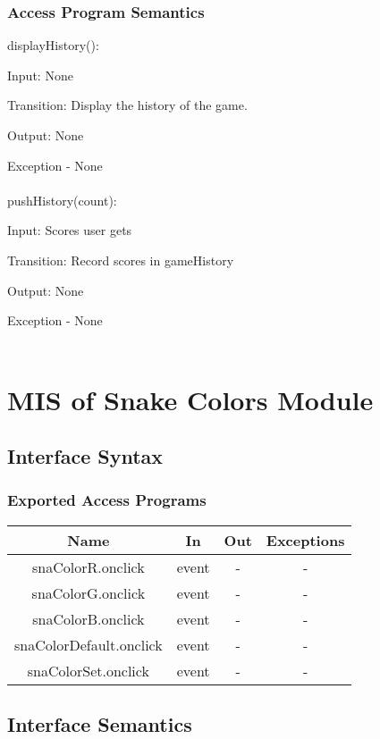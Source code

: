\documentclass[12pt, titlepage]{article}
\begin{document}
		\subsubsection{Access Program Semantics}

        displayHistory():

		Input: None
		
		Transition: Display the history of the game.
		
		Output: None
		
		Exception - None\\
		\\
		pushHistory(count):
		
			Input: Scores user gets
			
			Transition: Record scores in gameHistory
			
			Output: None
			 
			Exception - None\\
			\\


	
\section{MIS of Snake Colors Module}
		\subsection{Interface Syntax}
		\subsubsection{Exported Access Programs}
		\begin{tabular}[pos]{|c|c|c|c|}
			
			\hline
			\textbf{Name}& \textbf{In} & \textbf{Out} & \textbf{Exceptions} \\ \hline
			snaColorR.onclick & event & - & -\\ \hline
			snaColorG.onclick & event & - & -\\ \hline
			snaColorB.onclick & event & - & -\\ \hline
			snaColorDefault.onclick & event & - & -\\ \hline
			snaColorSet.onclick & event & - & -\\ \hline
		\end{tabular}
		
		\subsection{Interface Semantics}
\end{document}
